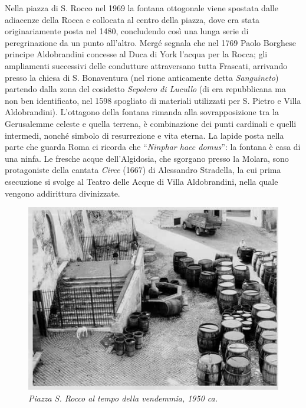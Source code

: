 \documentclass[
  letterpaper,
  DIV=11,
  numbers=noendperiod]{scrartcl}
\begin{document}
Nella piazza di S. Rocco nel 1969 la fontana ottogonale viene spostata
dalle adiacenze della Rocca e collocata al centro della piazza, dove era
stata originariamente posta nel 1480, concludendo così una lunga serie
di peregrinazione da un punto all'altro. Mergé segnala che nel 1769
Paolo Borghese principe Aldobrandini concesse al Duca di York l'acqua
per la Rocca; gli ampliamenti successivi delle condutture attraversano
tutta Frascati, arrivando presso la chiesa di S. Bonaventura (nel rione
anticamente detta \emph{Sanguineto}) partendo dalla zona del cosidetto
\emph{Sepolcro di Lucullo} (di era repubblicana ma non ben identificato,
nel 1598 spogliato di materiali utilizzati per S. Pietro e Villa
Aldobrandini). L'ottagono della fontana rimanda alla sovrapposizione tra
la Gerusalemme celeste e quella terrena, è combinazione dei punti
cardinali e quelli intermedi, nonché simbolo di resurrezione e vita
eterna. La lapide posta nella parte che guarda Roma ci ricorda che
``\emph{Ninphar haec domus}'': la fontana è casa di una ninfa. Le
fresche acque dell'Algidosia, che sgorgano presso la Molara, sono
protagoniste della cantata \emph{Circe} (1667) di Alessandro Stradella,
la cui prima esecuzione si svolge al Teatro delle Acque di Villa
Aldobrandini, nella quale vengono addirittura divinizzate.

\begin{figure}

{\centering \includegraphics{../../images/2024/san_rocco/7san-rocco-botti.jpg}

}

\caption{\emph{Piazza S. Rocco al tempo della vendemmia, 1950 ca.}}

\end{figure}
\end{document}
